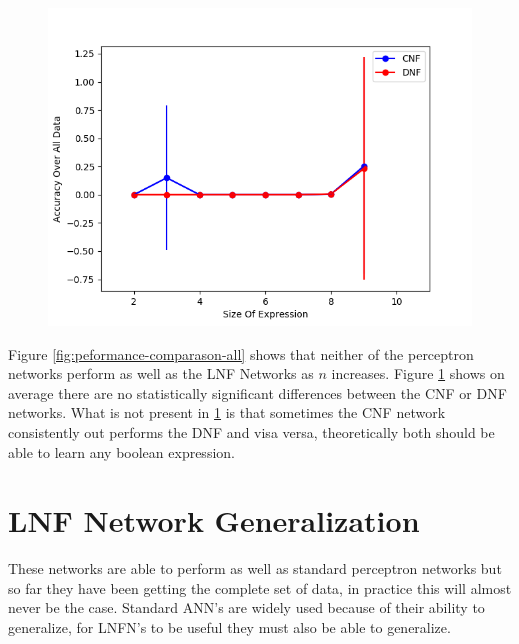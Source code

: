 \begin{figure}[H]
  \centering
  \begin{minipage}[b]{0.8\textwidth}
    \includegraphics[width=\textwidth]{CNFvsDNF.png}
    \caption{}
    \label{fig:peformance-comparason-cnfdnf}
  \end{minipage}
  \hfill
\end{figure}

Figure  \ref{fig:peformance-comparason-all} shows that neither of the perceptron networks perform as well as the LNF Networks as $n$ increases. Figure  \ref{fig:peformance-comparason-cnfdnf} shows on average there are no statistically significant differences between the CNF or DNF networks. What is not present in  \ref{fig:peformance-comparason-cnfdnf} is that sometimes the CNF network consistently out performs the DNF and visa versa, theoretically both should be able to learn any boolean expression. 

\section{LNF Network Generalization}
These networks are able to perform as well as standard perceptron networks but so far they have been getting the complete set of data, in practice this will almost never be the case. Standard ANN's are widely used because of their ability to generalize, for LNFN's to be useful they must also be able to generalize.

